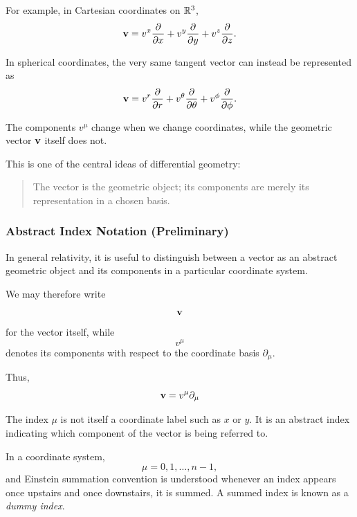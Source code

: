 		For example, in Cartesian coordinates on $\mathbb{R}^3$,
		\begin{equation}
			\vb{v}
			=
			v^x\pdv{}{x}
			+
			v^y\pdv{}{y}
			+
			v^z\pdv{}{z}.
			\label{eq:cartesian-vector}
		\end{equation}

		In spherical coordinates, the very same tangent vector can instead
		be represented as
		\begin{equation}
			\vb{v}
			=
			v^r\pdv{}{r}
			+
			v^\theta\pdv{}{\theta}
			+
			v^\phi\pdv{}{\phi}.
			\label{eq:spherical-vector}
		\end{equation}

		The components
		$
		    v^\mu
		$
		change when we change coordinates, while the geometric vector
		$\vb{v}$ itself does not.

		This is one of the central ideas of differential geometry:

		\begin{quote}
			The vector is the geometric object; its components are merely its
			representation in a chosen basis.
		\end{quote}

	\subsubsection{Abstract Index Notation (Preliminary)}

		In general relativity, it is useful to distinguish between a vector
		as an abstract geometric object and its components in a particular
		coordinate system.

		We may therefore write
		\[
			\vb{v}
		\]
		for the vector itself, while
		\[
			v^\mu
		\]
		denotes its components with respect to the coordinate basis
		$\partial_\mu$.

		Thus,
		\begin{equation}
			\vb{v}
			=
			v^\mu\partial_\mu
			\label{eq:abstract-index-vector}
		\end{equation}

		The index $\mu$ is not itself a coordinate label such as $x$ or $y$.
		It is an abstract index indicating which component of the vector is
		being referred to.

		In a coordinate system,
		\[
			\mu=0,1,\ldots,n-1,
		\]
		and Einstein summation convention is understood whenever an index
		appears once upstairs and once downstairs, it is summed. A summed index is known as a \textit{dummy index}.

